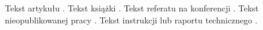 \documentclass{article}
\begin{document}
Tekst artykułu \cite{article1}. Tekst książki \cite{book1}. Tekst referatu na konferencji \cite{conference1}. Tekst nieopublikowanej pracy \cite{unpublished1}. Tekst instrukcji lub raportu technicznego \cite{manual1}.



\end{document}
